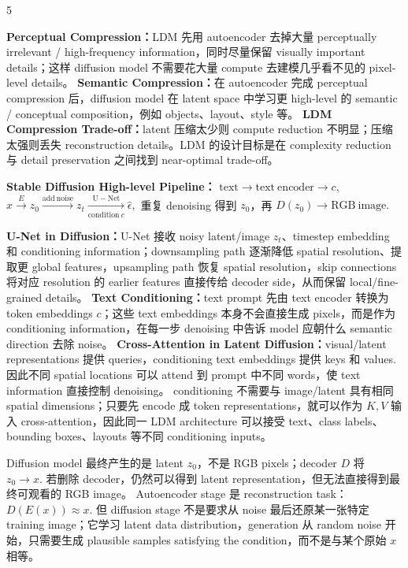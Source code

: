 \documentclass[a4paper, landscape]{article}
\begin{document}
\begin{multicols}{5}
\par \textbf{Perceptual Compression：}LDM 先用 autoencoder 去掉大量 perceptually irrelevant / high-frequency information，同时尽量保留 visually important details；这样 diffusion model 不需要花大量 compute 去建模几乎看不见的 pixel-level details。
\textbf{Semantic Compression：}在 autoencoder 完成 perceptual compression 后，diffusion model 在 latent space 中学习更 high-level 的 semantic / conceptual composition，例如 objects、layout、style 等。
\textbf{LDM Compression Trade-off：}latent 压缩太少则 compute reduction 不明显；压缩太强则丢失 reconstruction details。LDM 的设计目标是在 complexity reduction 与 detail preservation 之间找到 near-optimal trade-off。

\par \textbf{Stable Diffusion High-level Pipeline：}
\(
\mathrm{text}
\rightarrow
\mathrm{text\ encoder}
\rightarrow c,
\)
\(
x
\xrightarrow{E}
z_0
\xrightarrow{\mathrm{add\ noise}}
z_t
\xrightarrow[\mathrm{condition}\ c]{\mathrm{U\!-\!Net}}
\hat\epsilon,
\)
重复 denoising 得到 \(z_0\)，再
\(
D(z_0)\rightarrow\mathrm{RGB\ image}.
\)

\par \textbf{U-Net in Diffusion：}U-Net 接收 noisy latent/image \(z_t\)、timestep embedding 和 conditioning information；downsampling path 逐渐降低 spatial resolution、提取更 global features，upsampling path 恢复 spatial resolution，skip connections 将对应 resolution 的 earlier features 直接传给 decoder side，从而保留 local/fine-grained details。
\textbf{Text Conditioning：}text prompt 先由 text encoder 转换为 token embeddings \(c\)；这些 text embeddings 本身不会直接生成 pixels，而是作为 conditioning information，在每一步 denoising 中告诉 model 应朝什么 semantic direction 去除 noise。
\textbf{Cross-Attention in Latent Diffusion：}visual/latent representations 提供 queries，conditioning text embeddings 提供 keys 和 values. 因此不同 spatial locations 可以 attend 到 prompt 中不同 words，使 text information 直接控制 denoising。
conditioning 不需要与 image/latent 具有相同 spatial dimensions；只要先 encode 成 token representations，就可以作为 \(K,V\) 输入 cross-attention，因此同一 LDM architecture 可以接受 text、class labels、bounding boxes、layouts 等不同 conditioning inputs。

Diffusion model 最终产生的是 latent \(z_0\)，不是 RGB pixels；decoder \(D\) 将
\(
z_0\rightarrow x.
\)
若删除 decoder，仍然可以得到 latent representation，但无法直接得到最终可观看的 RGB image。
Autoencoder stage 是 reconstruction task：
\(
D(E(x))\approx x.
\)
但 diffusion stage 不是要求从 noise 最后还原某一张特定 training image；它学习 latent data distribution，generation 从 random noise 开始，只需要生成 plausible samples satisfying the condition，而不是与某个原始 \(x\) 相等。


\end{multicols}
\end{document}
